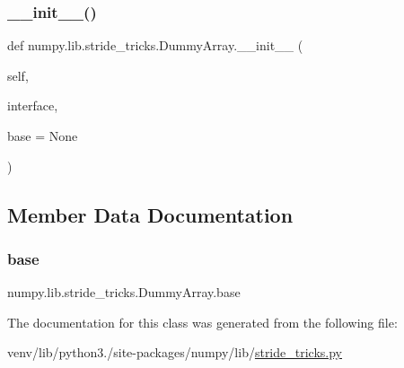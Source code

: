 \subsubsection{\texorpdfstring{\+\_\+\+\_\+init\+\_\+\+\_\+()}{\_\_init\_\_()}}
{\footnotesize\ttfamily def numpy.\+lib.\+stride\+\_\+tricks.\+Dummy\+Array.\+\_\+\+\_\+init\+\_\+\+\_\+ (\begin{DoxyParamCaption}\item[{}]{self,  }\item[{}]{interface,  }\item[{}]{base = {\ttfamily None} }\end{DoxyParamCaption})}



\subsection{Member Data Documentation}
\mbox{\label{classnumpy_1_1lib_1_1stride__tricks_1_1DummyArray_a0a3203b47f4b728b77dfe418ae2f427e}} 
\subsubsection{\texorpdfstring{base}{base}}
{\footnotesize\ttfamily numpy.\+lib.\+stride\+\_\+tricks.\+Dummy\+Array.\+base}



The documentation for this class was generated from the following file\+:\begin{DoxyCompactItemize}
\item 
venv/lib/python3./site-\/packages/numpy/lib/\hyperlink{stride__tricks_8py}{stride\+\_\+tricks.\+py}\end{DoxyCompactItemize}
